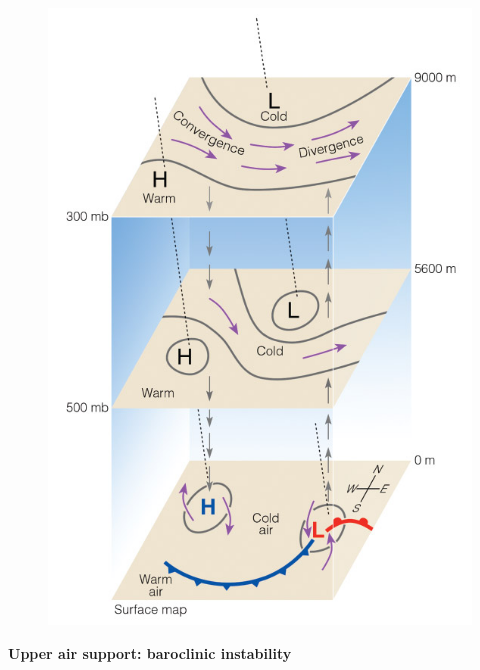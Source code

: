 \documentclass[12pt,oneside]{book}
\begin{document}
\begin{figure}

{\centering \includegraphics[width=0.8\linewidth]{figures/Figure633a} 

}

\caption{ }\label{fig:Fig633a}
\end{figure}

\textbf{Upper air support: baroclinic instability}
\end{document}
